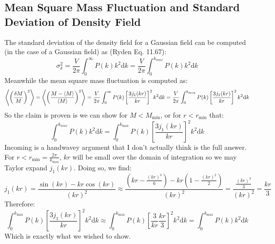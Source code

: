 \subsection{Mean Square Mass Fluctuation and Standard Deviation of Density Field}
The standard deviation of the density field for a Gaussian field can be computed (in the case of a Gaussian field) as (Ryden Eq. 11.67):
\begin{equation}
    \sigma_\delta^2 = \frac{V}{2\pi}\int_0^\infty P(k)k^2 \mathrm dk = \frac{V}{2\pi}\int_0^{k_{max}} P(k)k^2 \mathrm dk
\end{equation}
Meanwhile the mean square mass fluctuation is computed as:
\begin{equation}
    \left< \left(\frac{\delta M}{M}\right)^2 \right> = \left< \left(\frac{M  - \left< M \right>}{\left< M \right>}\right)^2 \right> = \frac{V}{2\pi }\int_0^{\infty}P(k)\left[\frac{3j_1(kr)}{kr}\right]^2 k^2 \mathrm d k = \frac{V}{2\pi }\int_0^{k_{\text{max}}}P(k)\left[\frac{3j_1(kr)}{kr}\right]^2 k^2 \mathrm d k 
\end{equation}
So the claim is proven is we can show for $M < M_{\text{min}}$, or for $r < r_{\text{min}}$ that:
\begin{equation}
    \int_{0}^{k_{max}} P(k)k^2 \mathrm d k = \int_0^{k_{\text{max}}}P(k)\left[\frac{3j_1(kr)}{kr}\right]^2 k^2 \mathrm d k 
\end{equation}
Incoming is a handwavey argument that I don't actually think is the full answer. For $r < r_{\text{min}} = \frac{2\pi}{k_{\text{max}}}$, $kr$ will be small over the domain of integration so we may Taylor expand $j_1(kr)$. Doing so, we find:
\begin{equation}
    j_1(kr) = \frac{\sin(kr) - kr\cos(kr)}{(kr)^2} \approx \frac{(kr - \frac{(kr)^3}{6}) - kr\left(1 - \frac{(kr)^2}{2}\right)}{(kr)^2} = \frac{\frac{(kr)^3}{3}}{(kr)^2} = \frac{kr}{3}
\end{equation}
Therefore:
\begin{equation}
    \int_0^{k_{\text{max}}}P(k)\left[\frac{3j_1(kr)}{kr}\right]^2 k^2 \mathrm d k \approx  \int_0^{k_{\text{max}}}P(k)\left[\frac{3}{kr}\frac{kr}{3}\right]^2 k^2 \mathrm d k = \int_0^{k_{\text{max}}}P(k) k^2 \mathrm d k
\end{equation}
Which is exactly what we wished to show.